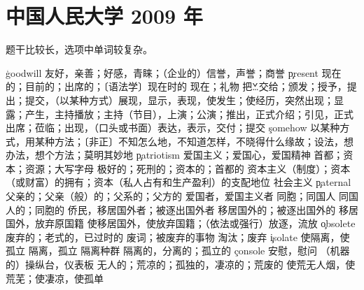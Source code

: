 \section{中国人民大学 2009 年}
题干比较长，选项中单词较复杂。
\begin{multicols}{2}
\c{goodwill}  \n 友好，亲善；好感，青睐；（企业的）信誉，声誉；商誉
\c{present}  \a 现在的；目前的；出席的；〔语法学〕现在时的 \n 现在；礼物  \v 把…交给；颁发；授予，提出；提交，（以某种方式）展现，显示，表现，使发生；使经历，突然出现；显露；产生，主持播放；主持（节目），上演；公演；推出，正式介绍；引见，正式出席；莅临；出现，（口头或书面）表达，表示，交付；提交 
\c{somehow}  \ad 以某种方式，用某种方法；〔非正〕不知怎么地，不知道怎样，不晓得什么缘故；设法，想办法，想个方法；莫明其妙地
\c{patriotism}  \n 爱国主义；爱国心，爱国精神
  \n 首都；资本；资源；大写字母 \a 极好的；死刑的；资本的；首都的
  \n 资本主义（制度）；资本（或财富）的拥有；资本（私人占有和生产盈利）的支配地位
  \n 社会主义
\c{paternal}  \a 父亲的；父亲（般）的；父系的；父方的
  \n 爱国者，爱国主义者
  \n 同胞；同国人 \a 同国人的；同胞的
  \n 侨民，移居国外者；被逐出国外者 \a 移居国外的；被逐出国外的 \vi 移居国外，放弃原国籍 \vt 使移居国外，使放弃国籍；（依法或强行）放逐，流放
\c{obsolete}  \a 废弃的；老式的，已过时的 \n 废词；被废弃的事物 \vt 淘汰；废弃
\c{isolate}  \vt 使隔离，使孤立 \vi 隔离，孤立 \n 隔离种群 \a 隔离的，分离的；孤立的
\c{console}  \vt 安慰，慰问 \n （机器的）操纵台，仪表板
  \a 无人的；荒凉的；孤独的，凄凉的；荒废的 \vt 使荒无人烟，使荒芜；使凄凉，使孤单

\end{multicols}
